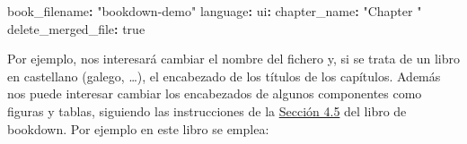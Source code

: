 \documentclass[
]{book}
\newenvironment{Shaded}{\begin{snugshade}}{\end{snugshade}}
\newcommand{\AttributeTok}[1]{\textcolor[rgb]{0.77,0.63,0.00}{#1}}
\newcommand{\CharTok}[1]{\textcolor[rgb]{0.31,0.60,0.02}{#1}}
\newcommand{\FunctionTok}[1]{\textcolor[rgb]{0.00,0.00,0.00}{#1}}
\newcommand{\KeywordTok}[1]{\textcolor[rgb]{0.13,0.29,0.53}{\textbf{#1}}}
\newcommand{\StringTok}[1]{\textcolor[rgb]{0.31,0.60,0.02}{#1}}
\theoremstyle{definition}
\theoremstyle{definition}
\theoremstyle{definition}
\theoremstyle{definition}
\theoremstyle{remark}
\begin{document}
\begin{Shaded}
\begin{Highlighting}[]
\FunctionTok{book\_filename}\KeywordTok{:}\AttributeTok{ }\StringTok{"bookdown{-}demo"}
\FunctionTok{language}\KeywordTok{:}
\AttributeTok{  }\FunctionTok{ui}\KeywordTok{:}
\AttributeTok{    }\FunctionTok{chapter\_name}\KeywordTok{:}\AttributeTok{ }\StringTok{"Chapter "}
\FunctionTok{delete\_merged\_file}\KeywordTok{:}\AttributeTok{ }\CharTok{true}\AttributeTok{    }
\end{Highlighting}
\end{Shaded}

Por ejemplo, nos interesará cambiar el nombre del fichero y,
si se trata de un libro en castellano (galego, \ldots), el encabezado de los títulos de los capítulos.
Además nos puede interesar cambiar los encabezados de algunos componentes como figuras y tablas,
siguiendo las instrucciones de la \href{https://bookdown.org/yihui/bookdown/internationalization.html}{Sección 4.5}
del libro de bookdown.
Por ejemplo en este libro se emplea:
\end{document}
